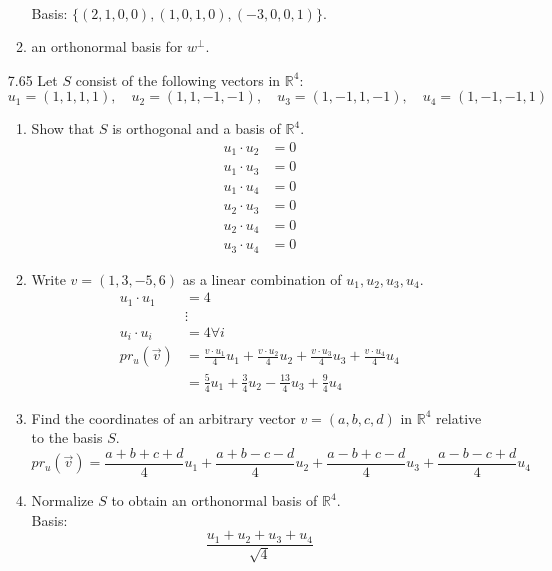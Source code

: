 \documentclass[12pt]{article}
\theoremstyle{definition}
\theoremstyle{plain}
\begin{document}
\begin{enumerate}
\begin{enumerate}
\begin{align*}
		\end{align*}
		Basis: $\{(2,1,0,0),(1,0,1,0),(-3,0,0,1)\}$.
	\item an orthonormal basis for $w^\perp$.
	\end{enumerate}
\item[7.65]Let $S$ consist of the following vectors in $\mathbb{R}^4$:
\[ u_1=(1,1,1,1), \quad u_2=(1,1,-1,-1), \quad u_3=(1,-1,1,-1), \quad u_4=(1,-1,-1,1) \]
	\begin{enumerate}
	\item Show that $S$ is orthogonal and a basis of $\mathbb{R}^4$.\\
		\begin{align*}
		u_1\cdot u_2&=0\\
		u_1\cdot u_3 &= 0\\
		u_1\cdot u_4 &= 0\\
		u_2\cdot u_3 &= 0\\
		u_2\cdot u_4 &= 0\\
		u_3\cdot u_4&= 0
		\end{align*}
	\item Write $v=(1,3,-5,6)$ as a linear combination of $u_1,u_2,u_3,u_4$.
		\begin{align*}
		u_1\cdot u_1 &= 4\\
		&\vdots\\
		u_i\cdot u_i &= 4 \forall i\\
		pr_u(\vec{v})&=\frac{v\cdot u_1}{4}u_1+\frac{v\cdot u_2}{4}u_2+\frac{v\cdot u_3}{4}u_3+\frac{v\cdot u_4}{4}u_4\\
		&=\frac{5}{4}u_1+\frac{3}{4}u_2-\frac{13}{4}u_3+\frac{9}{4}u_4
		\end{align*}
	\item Find the coordinates of an arbitrary vector $v=(a,b,c,d)$ in $\mathbb{R}^4$ relative to the basis $S$.\\
		\[ pr_u(\vec{v}) = \frac{a+b+c+d}{4}u_1+\frac{a+b-c-d}{4}u_2+\frac{a-b+c-d}{4}u_3+\frac{a-b-c+d}{4}u_4 \]
	\item Normalize $S$ to obtain an orthonormal basis of $\mathbb{R}^4$.\\
		Basis: 
		\[ \frac{u_1+u_2+u_3+u_4}{\sqrt{4}} \]
	\end{enumerate}


\end{enumerate}
\end{document}
